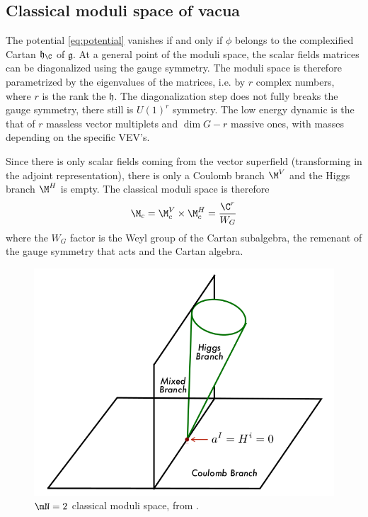 \documentclass{worksheetclass}
\begin{document}
    \subsection{Classical moduli space of vacua}

        The potential \eqref{eq:potential} vanishes if and only if $\phi$ belongs to the complexified Cartan $\mathfrak{h}_\C$ of $\mathfrak{g}$. At a general point of the moduli space, the scalar fields matrices can be diagonalized using the gauge symmetry. The moduli space is therefore parametrized by the eigenvalues of the matrices, i.e. by $r$ complex numbers, where $r$ is the rank the $\mathfrak{h}$. The diagonalization step does not fully breaks the gauge symmetry, there still is $U(1)^r$ symmetry. The low energy dynamic is the that of $r$ massless vector multiplets and $\dim G-r$ massive ones, with masses depending on the specific VEV's.

        Since there is only scalar fields coming from the vector superfield (transforming in the adjoint representation), there is only a Coulomb branch $\M^V$ and the Higgs branch $\M^H$ is empty. The classical moduli space is therefore
        \begin{eqnarray}
            \M_c = \M^V_{c}\times\M^H_{c}=\frac{\C^r}{W_G}\label{eq:classicalmodulispaceproduct}
        \end{eqnarray}
        where the $W_G$ factor is the Weyl group of the Cartan subalgebra, the remenant of the gauge symmetry that acts and the Cartan algebra.

        \begin{figure}[H]
            \centering
            \includegraphics[scale=0.35]{Pictures/classicalmodulispace.png}
            \caption{$\mN=2$ classical moduli space, from \cite{bertolinisusy}.}
        \end{figure}
\end{document}
